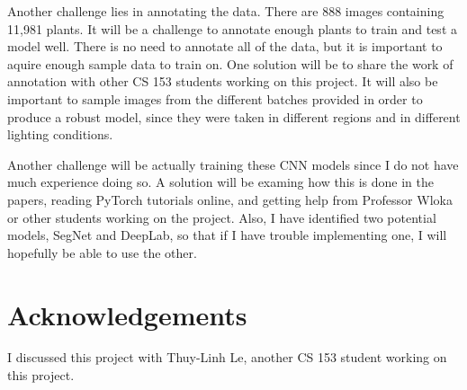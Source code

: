 \documentclass[10pt,twocolumn,letterpaper]{article}
\begin{document}
Another challenge lies in annotating the data. There are 888 images containing 11,981 plants. It will be a challenge to annotate enough plants to train and test a model well. There is no need to annotate all of the data, but it is important to aquire enough sample data to train on. One solution will be to share the work of annotation with other CS 153 students working on this project. It will also be important to sample images from the different batches provided in order to produce a robust model, since they were taken in different regions and in different lighting conditions.

Another challenge will be actually training these CNN models since I do not have much experience doing so. A solution will be examing how this is done in the papers, reading PyTorch tutorials online, and getting help from Professor Wloka or other students working on the project. Also, I have identified two potential models, SegNet and DeepLab, so that if I have trouble implementing one, I will hopefully be able to use the other.

\section*{Acknowledgements}

I discussed this project with Thuy-Linh Le, another CS 153 student working on this project.

{\small


}
\end{document}
